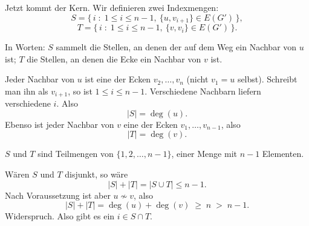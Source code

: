 \begin{merksatz}
Jetzt kommt der Kern. Wir definieren zwei Indexmengen:
\[ S = \{\, i \;:\; 1 \le i \le n-1,\ \{u, v_{i+1}\} \in E(G') \,\}, \]
\[ T = \{\, i \;:\; 1 \le i \le n-1,\ \{v, v_{i}\} \in E(G') \,\} . \]

In Worten: $S$ sammelt die Stellen, an denen der  auf dem Weg ein Nachbar von $u$ ist; $T$ die Stellen, an denen die Ecke  ein Nachbar von $v$ ist.

Jeder Nachbar von $u$ ist eine der Ecken $v_2, \ldots, v_n$ (nicht $v_1 = u$ selbst). Schreibt man ihn als $v_{i+1}$, so ist $1 \le i \le n-1$. Verschiedene Nachbarn liefern verschiedene $i$. Also
\[ |S| = \deg(u) . \]
Ebenso ist jeder Nachbar von $v$ eine der Ecken $v_1, \ldots, v_{n-1}$, also
\[ |T| = \deg(v) . \]

$S$ und $T$ sind Teilmengen von $\{1, 2, \ldots, n-1\}$, einer Menge mit $n-1$ Elementen.

Wären $S$ und $T$ disjunkt, so wäre
\[ |S| + |T| = |S \cup T| \le n-1 . \]
Nach Voraussetzung ist aber $u \not\sim v$, also
\[ |S| + |T| = \deg(u) + \deg(v) \;\ge\; n \;>\; n - 1 . \]
Widerspruch. Also gibt es ein $i \in S \cap T$.
\end{merksatz}

